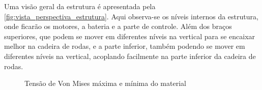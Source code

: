 Uma visão geral da estrutura é apresentada pela \ref{fig:vista_perspectiva_estrutura}. Aqui observa-se os níveis internos da estrutura, onde ficarão os motores, a bateria e a parte de controle. Além dos braços superiores, que podem se mover em diferentes níveis na vertical para se encaixar melhor na cadeira de rodas, e a parte inferior, também podendo se mover em diferentes níveis na vertical, acoplando facilmente na parte inferior da cadeira de rodas.

\begin{figure}[!ht]
  \caption{Tensão de Von Mises máxima e mínima do material}\label{fig:analise_von_mises}
\end{figure}


